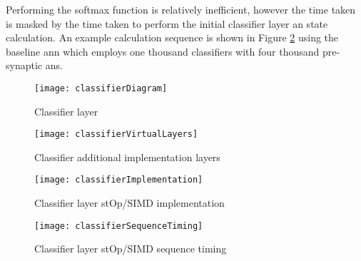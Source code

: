Performing the softmax function is relatively inefficient, however the time taken is masked by the time taken to perform the initial classifier layer \ac{an} state calculation.
An example calculation sequence is shown in Figure \ref{fig:classifier implementation sequence timing} using the baseline \ac{ann} which employs one thousand classifiers with four thousand pre-synaptic \acp{an}.
\begin{figure}[h]
  \vspace{-5mm}
  \centering
  \captionsetup{justification=centering}
  \captionsetup{width=0.9\textwidth}
  \begin{minipage}{1\textwidth}
    \centering
    \centerline{
    \mbox{\texttt{[image: classifierDiagram]}}
    }
    \center\caption{Classifier layer}
    \label{fig:classifier layer}
  \end{minipage}
  \bigskip
  \vspace{-1mm}
  \begin{minipage}{1\textwidth}
    \centering
    \centerline{
    \mbox{\texttt{[image: classifierVirtualLayers]}}
    }
    \caption{Classifier additional implementation layers}
    \label{fig:classifier additional layers}
  \end{minipage}
\end{figure}

\thispagestyle{lscapedlee}
\begin{landscape}
  \centering
  \begin{figure}[h]
    \centering
    \vspace{0mm}
    \captionsetup{justification=centering}
    \captionsetup{width=0.9\linewidth}
    \begin{minipage}{1\linewidth}
      \centering
      \centerline{
      \mbox{\texttt{[image: classifierImplementation]}}
      }
      \caption{Classifier layer stOp/SIMD implementation}
      \label{fig:classifier implementation}
    \end{minipage}
    \bigskip
    \vspace{1mm}
    \begin{minipage}{1\linewidth}
      \centering
      \centerline{
      \mbox{\texttt{[image: classifierSequenceTiming]}}
      }
      \caption{Classifier layer stOp/SIMD sequence timing}
      \label{fig:classifier implementation sequence timing}
    \end{minipage}
  \end{figure}
\end{landscape}
\restoregeometry
{}
\pagestyle{plain}
\thispagestyle{plain}

